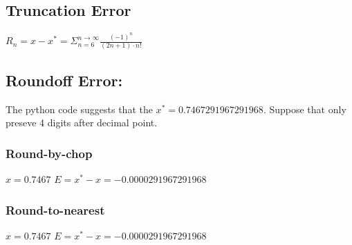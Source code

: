 \documentclass[12pt]{article}
\begin{document}
\subsection*{Truncation Error}
\begin{center}
    \(R_n = x - x^* = \Sigma_{n = 6}^{n \to \infty}\frac{{(-1)^{n}}}{(2n+1) \cdot n!}\)  
\end{center}
\subsection*{Roundoff Error:}
The python code suggests that the \(x^* =  0.7467291967291968.\) Suppose that only preseve 4 digits after decimal point.
\subsubsection*{Round-by-chop}
\begin{center}
    \(x = 0.7467\) \(E = x^* - x = -0.0000291967291968 \)
\end{center}
\subsubsection*{Round-to-nearest}
\begin{center}
    \(x = 0.7467\) \(E = x^* - x = -0.0000291967291968 \)
\end{center}
\end{document}
